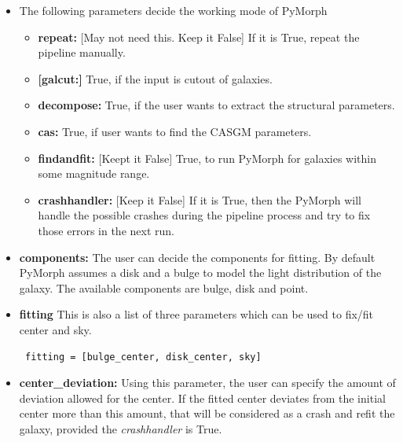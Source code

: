 \documentclass[a4paper,10pt]{article}
\newcommand{\red}[1]{{\color{red}[#1]}}
\begin{document}
\begin{itemize}
\item The following parameters decide the working mode of PyMorph
\begin{itemize}
\item[] \textbf{repeat:} \red{May not need this. Keep it False} If it is True, repeat the pipeline manually.
\item[] \textbf{\red{galcut:}} True, if the input is cutout of galaxies.
\item[] \textbf{decompose:} True, if the user wants to extract the structural parameters.
\item[] \textbf{cas:} True, if user wants to find the CASGM parameters.
\item[] \textbf{findandfit:} \red{Keept it False} True, to run PyMorph for galaxies within some magnitude range.
\item[] \textbf{crashhandler:} \red{Keep it False} If it is True, then the PyMorph will handle the possible crashes during the pipeline process and try to fix those  errors in the next run. %
\end{itemize}

\item \textbf{components:} The user can decide the components for fitting. By default PyMorph assumes a disk and a bulge to model the light distribution of the galaxy. The available components are bulge, disk and point.
\item \textbf{fitting} This is also a list of three parameters which can be used to fix/fit center and sky.
\begin{verbatim} fitting = [bulge_center, disk_center, sky]
\end{verbatim}
% 

\item \textbf{center\_deviation:} Using this parameter, the user can specify the amount of deviation allowed for the center. If the fitted center deviates from the initial center more than this amount, that will be considered as a crash and refit the galaxy, provided the \textit{crashhandler} is True.


\end{itemize}
\end{document}
